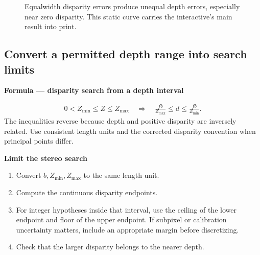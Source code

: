 \documentclass[letterpaper,11pt,english,openany,oneside]{jupyterBook}
\begin{document}
\begin{figure}[H]
\centering
\capstart

\noindent{}
\caption{Equal\sphinxhyphen{}width disparity errors produce unequal depth errors, especially near zero disparity. This static curve carries the interactive’s main result into print.}\label{\detokenize{lectures/lecture04/stereo:fig-lec04-depth-sensitivity}}\end{figure}

\par\medskip


\subsection{Convert a permitted depth range into search limits}
\label{\detokenize{lectures/lecture04/stereo:convert-a-permitted-depth-range-into-search-limits}}
\begin{TextbookBox}
\textbf{Formula — disparity search from a depth interval}\par\smallskip
\begin{equation}\label{equation:lectures/lecture04/stereo:eq-lec04-disparity-range}
\begin{split}0<Z_{\min}\le Z\le Z_{\max}
\quad\Rightarrow\quad
\frac{fb}{Z_{\max}}\le d\le\frac{fb}{Z_{\min}}.\end{split}
\end{equation}
\sphinxAtStartPar
The inequalities reverse because depth and positive disparity are inversely related. Use consistent length units and the corrected disparity convention when principal points differ.

\end{TextbookBox}

\begin{TextbookBox}
\textbf{Limit the stereo search}\par\smallskip
\begin{enumerate}
%
\item {}
\sphinxAtStartPar
Convert \(b,Z_{\min},Z_{\max}\) to the same length unit.

\item {}
\sphinxAtStartPar
Compute the continuous disparity endpoints.

\item {}
\sphinxAtStartPar
For integer hypotheses inside that interval, use the ceiling of the lower endpoint and floor of the upper endpoint. If subpixel or calibration uncertainty matters, include an appropriate margin before discretizing.

\item {}
\sphinxAtStartPar
Check that the larger disparity belongs to the nearer depth.

\end{enumerate}

\end{TextbookBox}
\end{document}
